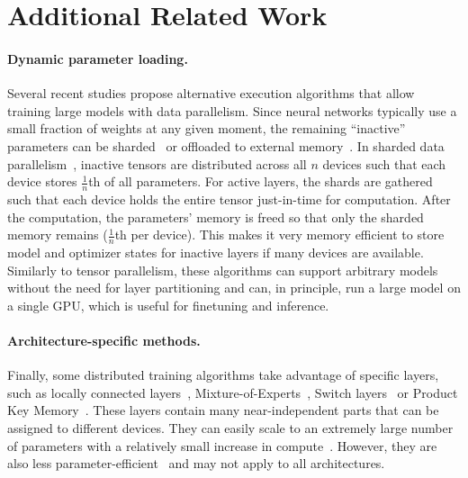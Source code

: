    



\section{Additional Related Work}\label{appendix:related}


\vspace{-2pt}
\paragraph{Dynamic parameter loading.} Several recent studies propose alternative execution algorithms that allow training large models with data parallelism. Since neural networks typically use a small fraction of weights at any given moment, the remaining ``inactive'' parameters can be sharded~\citep{zero} or offloaded to external memory~\citep{l2l,zerooffload,zero_ssd}. In sharded data parallelism~\cite{zero}, inactive tensors are distributed across all $n$ devices such that each device stores $\frac{1}{n}$th of all parameters. For active layers, the shards are gathered such that each device holds the entire tensor just-in-time for computation. After the computation, the parameters' memory is freed so that only the sharded memory remains ($\frac{1}{n}$th per device). This makes it very memory efficient to store model and optimizer states for inactive layers if many devices are available. Similarly to tensor parallelism, these algorithms can support arbitrary models without the need for layer partitioning and can, in principle, run a large model on a single GPU, which is useful for finetuning and inference.

\vspace{-6pt}
\paragraph{Architecture-specific methods.} Finally, some distributed training algorithms take advantage of specific layers, such as locally connected layers~\citep{dean12,coates13}, Mixture-of-Experts~\citep{moe_first,shazeer2017outrageously,Lepikhin2020GShardSG}, Switch layers~\citep{fedus2021switch} or Product Key Memory~\citep{pkm}. These layers contain many near-independent parts that can be assigned to different devices. They can easily scale to an extremely large number of parameters with a relatively small increase in compute~\citep{shazeer2017outrageously}. However, they are also less parameter-efficient~\citep{fedus2021switch} and may not apply to all architectures.

